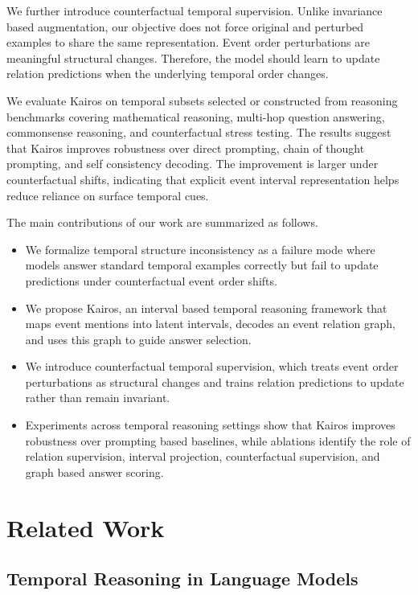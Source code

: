 \documentclass[11pt]{article}
\newcommand{\method}{Kairos}
\begin{document}
We further introduce counterfactual temporal supervision. Unlike invariance based augmentation, our objective does not force original and perturbed examples to share the same representation. Event order perturbations are meaningful structural changes. Therefore, the model should learn to update relation predictions when the underlying temporal order changes.

We evaluate \method{} on temporal subsets selected or constructed from reasoning benchmarks covering mathematical reasoning, multi-hop question answering, commonsense reasoning, and counterfactual stress testing. The results suggest that \method{} improves robustness over direct prompting, chain of thought prompting, and self consistency decoding. The improvement is larger under counterfactual shifts, indicating that explicit event interval representation helps reduce reliance on surface temporal cues.

The main contributions of our work are summarized as follows.

\begin{itemize}
    \item We formalize temporal structure inconsistency as a failure mode where models answer standard temporal examples correctly but fail to update predictions under counterfactual event order shifts.

    \item We propose \method, an interval based temporal reasoning framework that maps event mentions into latent intervals, decodes an event relation graph, and uses this graph to guide answer selection.

    \item We introduce counterfactual temporal supervision, which treats event order perturbations as structural changes and trains relation predictions to update rather than remain invariant.

    \item Experiments across temporal reasoning settings show that \method{} improves robustness over prompting based baselines, while ablations identify the role of relation supervision, interval projection, counterfactual supervision, and graph based answer scoring.
\end{itemize}

\section{Related Work}

\subsection{Temporal Reasoning in Language Models}
\end{document}
